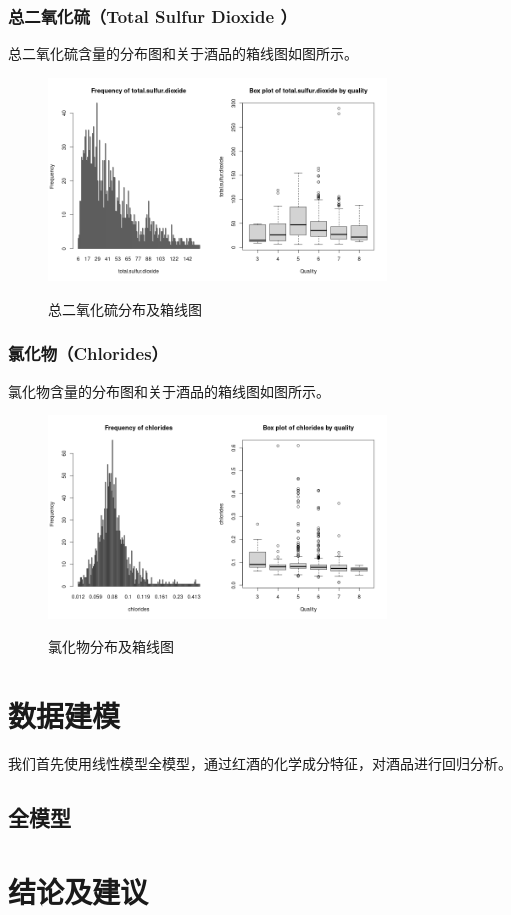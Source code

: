 \documentclass[fontset=ubuntu]{ctexart}
\begin{document}
            \subsubsection{总二氧化硫（Total Sulfur Dioxide ）}
                总二氧化硫含量的分布图和关于酒品的箱线图如图所示。
                \begin{figure}[htbp]
                    \centering
                    \includegraphics[width=0.8\textwidth]{../figures/total.sulfur.dioxide-plot.png}
                    \label{fig:total.sulfur.dioxide}
                    \caption{总二氧化硫分布及箱线图}
                \end{figure}   

            \subsubsection{氯化物（Chlorides）}
            氯化物含量的分布图和关于酒品的箱线图如图所示。
            \begin{figure}[htbp]
                \centering
                \includegraphics[width=0.8\textwidth]{../figures/chlorides-plot.png}
                \label{fig:chlorides}
                \caption{氯化物分布及箱线图}
            \end{figure} 
            
    \section{数据建模}
        我们首先使用线性模型全模型，通过红酒的化学成分特征，对酒品进行回归分析。

        \subsection{全模型}

    \section{结论及建议}

    \newpage
\end{document}
